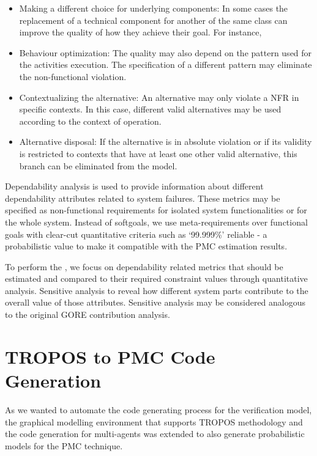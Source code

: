 \begin{itemize}

\item Making a different choice for underlying components: In some cases the replacement of a technical component for another of the same class can improve the quality of how they achieve their goal. For instance,
\medskip

\item Behaviour optimization: The quality may also depend on the pattern used for the activities execution. The specification of a different pattern may eliminate the non-functional violation. 
\medskip

\item Contextualizing the alternative: An alternative may only violate a NFR in specific contexts. In this case, different valid alternatives may be used according to the context of operation.
\medskip

\item Alternative disposal: If the alternative is in absolute violation or if its validity is restricted to contexts that have at least one other valid alternative, this branch can be eliminated from the model.

\end{itemize}



Dependability analysis is used to provide information about different dependability attributes related to system failures. These metrics may be specified as non-functional requirements for isolated system functionalities or for the whole system. Instead of softgoals, we use meta-requirements over functional goals with clear-cut quantitative criteria such as `99.999\%' reliable - a probabilistic value to make it compatible with the PMC estimation results.

To perform the , we focus on dependability related metrics that should be estimated and compared to their required constraint values through quantitative analysis. Sensitive analysis to reveal how different system parts contribute to the overall value of those attributes. Sensitive analysis may be considered analogous to the original GORE contribution analysis.



\section{TROPOS to PMC Code Generation}

As we wanted to automate the code generating process for the verification model, the graphical modelling environment that supports TROPOS methodology and the code generation for multi-agents was extended to also generate probabilistic models for the PMC technique.

